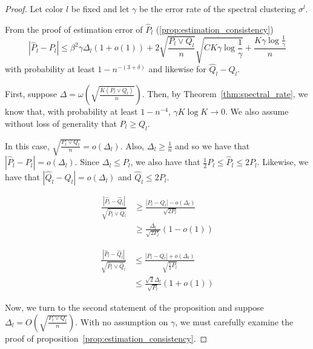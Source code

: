\documentclass{article}
\begin{document}
\begin{proof}

Let color $l$ be fixed and let $\gamma$ be the error rate of the spectral clustering $\sigma^l$. 

From the proof of estimation error of $\hat{P}_l$ (\ref{prop:estimation_consistency})
\[
|\hat{P}_l - P_l| \leq \beta^2 \gamma \Delta_l (1+o(1)) + 2 \sqrt{\frac{P_l \vee Q_l}{n} } \sqrt{ C K \gamma \log \frac{1}{\gamma}} + \frac{K \gamma \log \frac{1}{\gamma}}{n}
\]
with probability at least $1 - n^{-(3+\delta)}$  and likewise for $\hat{Q}_l - Q_l$. 

First, suppose $\Delta = \omega \left( \sqrt{ \frac{ K(P_l \vee Q_l)}{n}} \right)$. Then, by Theorem~\ref{thm:spectral_rate}, we know that, with probability at least $1 - n^{-4}$, $\gamma K \log K \rightarrow 0$. We also assume without loss of generality that $P_l \geq Q_l$. 


In this case, $\sqrt{ \frac{P_l \vee Q_l}{n}} = o( \Delta_l )$. Also, $\Delta_l \geq \frac{1}{n}$ and so we have that $| \hat{P}_l - P_l | = o(\Delta_l)$. Since $\Delta_l \leq P_l$, we also have that $ \frac{1}{2} P_l \leq \hat{P}_l  \leq 2 P_l$. Likewise, we have that $|\hat{Q}_l - Q_l| = o(\Delta_l)$ and $\hat{Q}_l \leq 2 P_l$. 

\begin{align*}
\frac{ | \hat{P}_l - \hat{Q}_l |}{\sqrt{\hat{P}_l \vee \hat{Q}_l}} &\geq 
          \frac{| P_l - Q_l | - o(\Delta_l)}{ \sqrt{2 P_l} } \\
  &\geq \frac{\Delta_l}{\sqrt{2 P_l} } (1 - o(1)) 
\end{align*}

\begin{align*}
\frac{ | \hat{P}_l - \hat{Q}_l |}{\sqrt{\hat{P}_l \vee \hat{Q}_l}} &\leq 
          \frac{| P_l - Q_l | + o(\Delta_l)}{ \sqrt{\frac{1}{2} P_l} } \\
  &\leq \frac{\sqrt{2} \Delta_l}{\sqrt{P_l} } (1 + o(1)) 
\end{align*}

Now, we turn to the second statement of the proposition and suppose  $\Delta_l = O\left( 
   \sqrt{\frac{P_l \vee Q_l}{n} } \right)$. With no assumption on $\gamma$, we must carefully examine the proof of proposition~\ref{prop:estimation_consistency}.


\end{proof}
\end{document}
